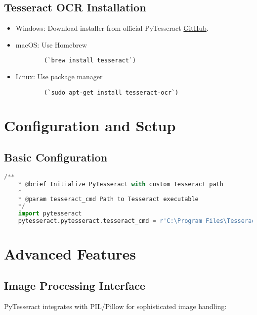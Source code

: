 \subsection{Tesseract OCR Installation}
\begin{itemize}
	
	\item Windows: Download installer from official PyTesseract
	\href{https://github.com/madmaze/pytesseract}{GitHub}.
	\item macOS: Use Homebrew 
	\begin{lstlisting}
		(`brew install tesseract`)
	\end{lstlisting}
	
	\item Linux: Use package manager 
	\begin{lstlisting}
		(`sudo apt-get install tesseract-ocr`)
	\end{lstlisting}
	
\end{itemize}

\section{Configuration and Setup}
\subsection{Basic Configuration}
\begin{lstlisting}[language=Python]
	/**
	* @brief Initialize PyTesseract with custom Tesseract path
	* 
	* @param tesseract_cmd Path to Tesseract executable
	*/
	import pytesseract
	pytesseract.pytesseract.tesseract_cmd = r'C:\Program Files\Tesseract-OCR\tesseract.exe'
\end{lstlisting}


\section{Advanced Features}
\subsection{Image Processing Interface}
PyTesseract integrates with PIL/Pillow for sophisticated image handling:

